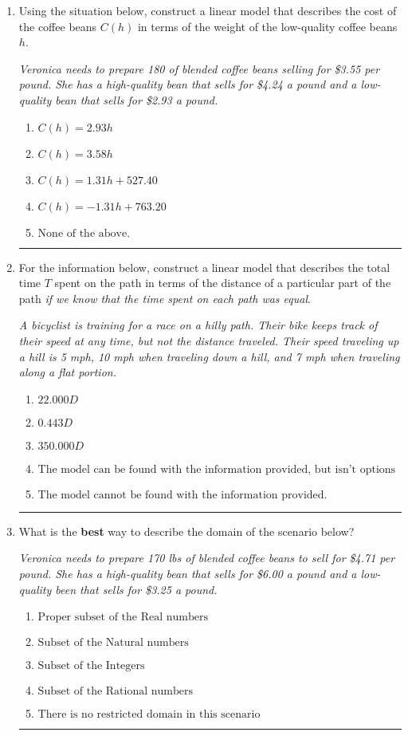 \documentclass[14pt]{extbook}
\newcommand{\litem}[1]{\item#1\hspace*{-1cm}\rule{\textwidth}{0.4pt}}
\begin{document}
\begin{enumerate}
\litem{
Using the situation below, construct a linear model that describes the cost of the coffee beans $C(h)$ in terms of the weight of the low-quality coffee beans $h$.
\begin{center}
    \textit{ Veronica needs to prepare 180 of blended coffee beans selling for \$3.55 per pound. She has a high-quality bean that sells for \$4.24 a pound and a low-quality bean that sells for \$2.93 a pound. }
\end{center}
\begin{enumerate}[label=\Alph*.]
\item \( C(h) = 2.93 h \)
\item \( C(h) = 3.58 h \)
\item \( C(h) = 1.31 h + 527.40 \)
\item \( C(h) = -1.31 h + 763.20 \)
\item \( \text{None of the above.} \)

\end{enumerate} }
\litem{
For the information below, construct a linear model that describes the total time $T$ spent on the path in terms of the distance of a particular part of the path \textit{if we know that the time spent on each path was equal}.
\begin{center}
    \textit{ A bicyclist is training for a race on a hilly path. Their bike keeps track of their speed at any time, but not the distance traveled. Their speed traveling up a hill is 5 mph, 10 mph when traveling down a hill, and 7 mph when traveling along a flat portion. }
\end{center}
\begin{enumerate}[label=\Alph*.]
\item \( 22.000 D \)
\item \( 0.443 D \)
\item \( 350.000 D \)
\item \( \text{The model can be found with the information provided, but isn't options 1-3.} \)
\item \( \text{The model cannot be found with the information provided.} \)

\end{enumerate} }
\litem{
What is the \textbf{best} way to describe the domain of the scenario below?
\begin{center}
    \textit{ Veronica needs to prepare 170 lbs of blended coffee beans to sell for \$4.71 per pound. She has a high-quality bean that sells for \$6.00 a pound and a low-quality been that sells for \$3.25 a pound. }
\end{center}
\begin{enumerate}[label=\Alph*.]
\item \( \text{Proper subset of the Real numbers} \)
\item \( \text{Subset of the Natural numbers} \)
\item \( \text{Subset of the Integers} \)
\item \( \text{Subset of the Rational numbers} \)
\item \( \text{There is no restricted domain in this scenario} \)


\end{enumerate}}
\end{enumerate}
\end{document}

